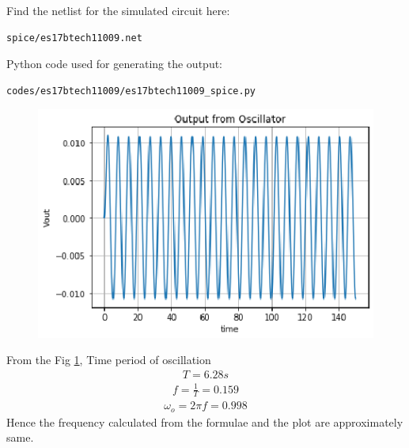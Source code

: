 \begin{enumerate}[label=\thesubsection.\arabic*.,ref=\thesubsection.\theenumi]
Find the netlist for the simulated circuit here:
\begin{lstlisting}
spice/es17btech11009.net
\end{lstlisting}
Python code used for generating the output:
\begin{lstlisting}
codes/es17btech11009/es17btech11009_spice.py
\end{lstlisting}
\begin{figure}[!ht]
\centering
\includegraphics[width=\columnwidth]{./figs/es17btech11009/es17btech11009_spice.eps}
\caption{}
\label{fig:es17btech11009_spice}
\end{figure}
From the Fig \ref{fig:es17btech11009_spice},
Time period of oscillation 
\begin{align}
    T = 6.28 s
\end{align}
\begin{align}
    f = \frac{1}{T} = 0.159
\end{align}
\begin{align}
    \omega_{o} = 2\pi f = 0.998
\end{align}
Hence the frequency calculated from the formulae and the plot are approximately same.
\end{enumerate}
